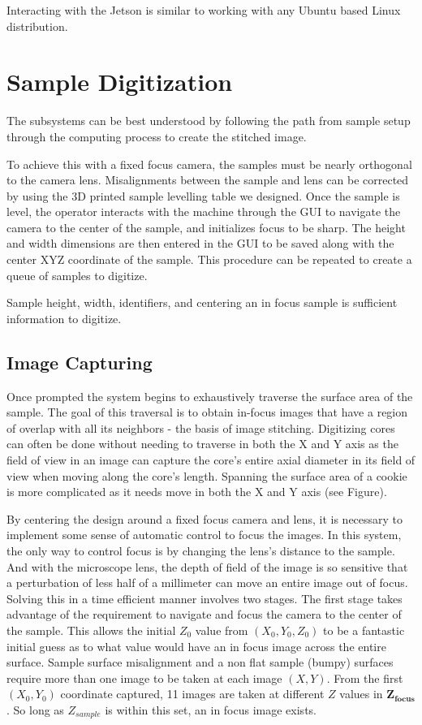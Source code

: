 \documentclass[a4paper,12pt]{article}
\begin{document}
Interacting with the Jetson is similar to working with any Ubuntu based Linux distribution. 

\section{Sample Digitization} %
The subsystems can be best understood by following the path from sample setup through the computing process to create the stitched image. 

To achieve this with a fixed focus camera, the samples must be nearly orthogonal to the camera lens. Misalignments between the sample and lens can be corrected by using the 3D printed sample levelling table we designed.
Once the sample is level, the operator interacts with the machine through the GUI to navigate the camera to the center of the sample, and initializes focus to be sharp. The height and width dimensions are then entered in the GUI
to be saved along with the center XYZ coordinate of the sample. This procedure can be repeated to create a queue of samples to digitize.

Sample height, width, identifiers, and centering an in focus sample is sufficient information to digitize.

\subsection{Image Capturing}
Once prompted the system begins to exhaustively traverse the surface area of the sample. 
The goal of this traversal is to obtain in-focus images that have a region of overlap with all its neighbors - the basis of image stitching. 
Digitizing cores can often be done without needing to traverse in both the X and Y axis as the field of view in an image can capture the core's entire axial diameter in its field of view when moving along the core's length. %
Spanning the surface area of a cookie is more complicated as it needs move in both the X and Y axis (see Figure).

By centering the design around a fixed focus camera and lens, it is necessary to implement some sense of automatic control to focus the images. 
In this system, the only way to control focus is by changing the lens's distance to the sample. 
And with the microscope lens, the depth of field of the image is so sensitive that a perturbation of less half of a millimeter can move an entire image out of focus.
Solving this in a time efficient manner involves two stages. 
The first stage takes advantage of the requirement to navigate and focus the camera to the center of the sample.
This allows the initial $Z_0$ value from $(X_0, Y_0, Z_0)$ to be a fantastic initial guess as to what value would have an in focus image across the entire surface. 
Sample surface misalignment and a non flat sample (bumpy) surfaces require more than one image to be taken at each image $(X, Y)$. 
From the first $(X_0, Y_0)$ coordinate captured, 11 images are taken at different $Z$ values in $\boldsymbol{Z_{\text{focus}}}$. 
So long as $Z_{sample}$ is within this set, an in focus image exists.
\end{document}
